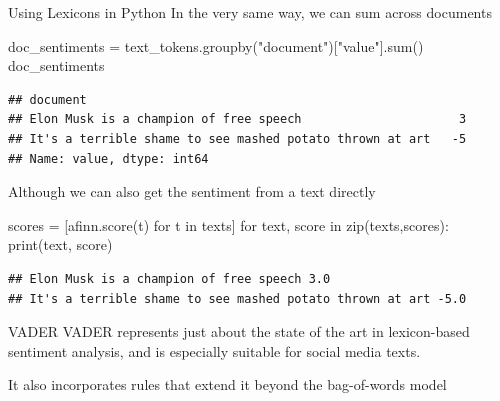 \documentclass[
  10pt,
  ignorenonframetext,
  aspectratio=169]{beamer}
\newenvironment{Shaded}{\begin{snugshade}}{\end{snugshade}}
\newcommand{\BuiltInTok}[1]{\textcolor[rgb]{0.80,0.80,0.80}{#1}}
\newcommand{\ControlFlowTok}[1]{\textcolor[rgb]{0.94,0.87,0.69}{#1}}
\newcommand{\KeywordTok}[1]{\textcolor[rgb]{0.94,0.87,0.69}{#1}}
\newcommand{\NormalTok}[1]{\textcolor[rgb]{0.80,0.80,0.80}{#1}}
\newcommand{\OperatorTok}[1]{\textcolor[rgb]{0.94,0.94,0.82}{#1}}
\newcommand{\StringTok}[1]{\textcolor[rgb]{0.80,0.58,0.58}{#1}}
\begin{document}
\begin{frame}[fragile]{Using Lexicons in Python}
\protect\hypertarget{using-lexicons-in-python-2}{}
In the very same way, we can sum across documents \medskip \scriptsize

\begin{Shaded}
\begin{Highlighting}[]
\NormalTok{doc\_sentiments }\OperatorTok{=}\NormalTok{ text\_tokens.groupby(}\StringTok{"document"}\NormalTok{)[}\StringTok{"value"}\NormalTok{].}\BuiltInTok{sum}\NormalTok{()}
\NormalTok{doc\_sentiments}
\end{Highlighting}
\end{Shaded}

\begin{verbatim}
## document
## Elon Musk is a champion of free speech                      3
## It's a terrible shame to see mashed potato thrown at art   -5
## Name: value, dtype: int64
\end{verbatim}

\medskip

Although we can also get the sentiment from a text directly

\begin{Shaded}
\begin{Highlighting}[]
\NormalTok{scores }\OperatorTok{=}\NormalTok{ [afinn.score(t) }\ControlFlowTok{for}\NormalTok{ t }\KeywordTok{in}\NormalTok{ texts]}
\ControlFlowTok{for}\NormalTok{ text, score }\KeywordTok{in} \BuiltInTok{zip}\NormalTok{(texts,scores):}
  \BuiltInTok{print}\NormalTok{(text, score)}
\end{Highlighting}
\end{Shaded}

\begin{verbatim}
## Elon Musk is a champion of free speech 3.0
## It's a terrible shame to see mashed potato thrown at art -5.0
\end{verbatim}
\end{frame}

\begin{frame}{VADER}
\protect\hypertarget{vader}{}
VADER represents just about the state of the art in lexicon-based
sentiment analysis, and is especially suitable for social media texts.

It also incorporates rules that extend it beyond the bag-of-words model
\end{frame}
\end{document}
